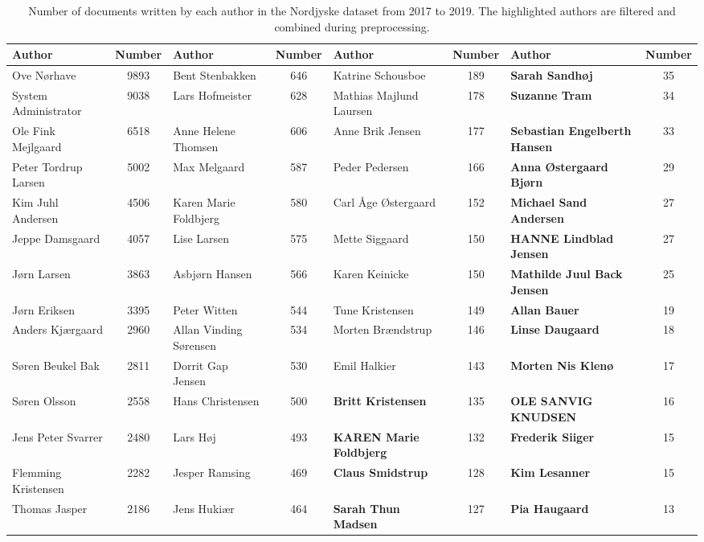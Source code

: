 \begin{table}[h]
	\caption{Number of documents written by each author in the Nordjyske dataset from 2017 to 2019.
	The highlighted authors are filtered and combined during preprocessing.}
	\label{tab:author_table}
	\centering
	\scriptsize
	\begin{tabular}{l|c|l|c|l|c|l|c}
		Author                & Number & Author                     & Number & Author                       & Number & Author                       & Number \\
		\midrule
		Ove Nørhave & 9893 & Bent Stenbakken & 646 & Katrine Schousboe & 189 & \textbf{Sarah Sandhøj} & 35 \\
		System Administrator & 9038 & Lars Hofmeister & 628 & Mathias Majlund Laursen & 178 & \textbf{Suzanne Tram} & 34 \\
		Ole Fink Mejlgaard & 6518 & Anne Helene Thomsen & 606 & Anne Brik Jensen & 177 & \textbf{Sebastian Engelberth Hansen} & 33 \\
		Peter Tordrup Larsen & 5002 & Max Melgaard & 587 & Peder Pedersen & 166 & \textbf{Anna Østergaard Bjørn} & 29 \\
		Kim Juhl Andersen & 4506 & Karen Marie Foldbjerg & 580 & Carl Åge Østergaard & 152 & \textbf{Michael Sand Andersen} & 27 \\
		Jeppe Damsgaard & 4057 & Lise Larsen & 575 & Mette Siggaard & 150 & \textbf{HANNE Lindblad Jensen} & 27 \\
		Jørn Larsen & 3863 & Asbjørn Hansen & 566 & Karen Keinicke & 150 & \textbf{Mathilde Juul Back Jensen} & 25 \\
		Jørn Eriksen & 3395 & Peter Witten & 544 & Tune Kristensen & 149 & \textbf{Allan Bauer} & 19 \\
		Anders Kjærgaard & 2960 & Allan Vinding Sørensen & 534 & Morten Brændstrup & 146 & \textbf{Linse Daugaard} & 18 \\
		Søren Beukel Bak & 2811 & Dorrit Gap Jensen & 530 & Emil Halkier & 143 & \textbf{Morten Nis Klenø} & 17 \\
		Søren Olsson & 2558 & Hans Christensen & 500 & \textbf{Britt Kristensen} & 135 & \textbf{OLE SANVIG KNUDSEN} & 16 \\
		Jens Peter Svarrer & 2480 & Lars Høj & 493 & \textbf{KAREN Marie Foldbjerg} & 132 & \textbf{Frederik Siiger} & 15 \\
		Flemming Kristensen & 2282 & Jesper Ramsing & 469 & \textbf{Claus Smidstrup} & 128 & \textbf{Kim Lesanner} & 15 \\
		Thomas Jasper & 2186 & Jens Hukiær & 464 & \textbf{Sarah Thun Madsen} & 127 & \textbf{Pia Haugaard} & 13 \\

\end{tabular}
\end{table}
